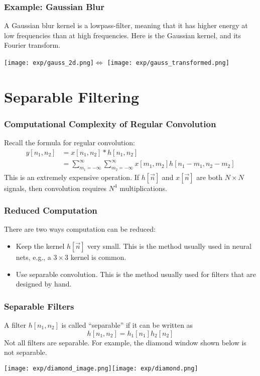 \documentclass{beamer}
\begin{document}
\begin{frame}
  \frametitle{Example: Gaussian Blur}

  A Gaussian blur kernel is a lowpass-filter, meaning that it has
  higher energy at low frequencies than at high frequencies.  Here is
  the Gaussian kernel, and its Fourier transform.

  \centerline{\texttt{[image: exp/gauss\_2d.png]}$\Leftrightarrow$
    \texttt{[image: exp/gauss\_transformed.png]}}
\end{frame}


\section{Separable Filtering}
\setcounter{subsection}{1}

\begin{frame}
  \frametitle{Computational Complexity of Regular Convolution}

  Recall the formula for regular convolution:
  \begin{align*}
    y[n_1,n_2] &= x[n_1,n_2]\ast h[n_1,n_2]\\
    &= \sum_{m_1=-\infty}^\infty\sum_{m_2=-\infty}^\infty x[m_1,m_2]h[n_1-m_1,n_2-m_2]
  \end{align*}
  This is an extremely expensive operation.  If $h[\vec{n}]$ and
  $x[\vec{n}]$ are both $N\times N$ signals, then convolution requires
  $N^4$ multiplications.
\end{frame}

\begin{frame}
  \frametitle{Reduced Computation}

  There are two ways computation can be reduced:
  \begin{itemize}
    \item Keep the kernel $h[\vec{n}]$ very small.  This is the method
      usually used in neural nets, e.g., a $3\times 3$ kernel is common.
    \item Use separable convolution.  This is the method usually used
      for filters that are designed by hand.
  \end{itemize}
\end{frame}

\begin{frame}
  \frametitle{Separable Filters}
  A filter $h[n_1,n_2]$ is called ``separable'' if it can be written as
  \[
  h[n_1,n_2] = h_1[n_1]h_2[n_2]
  \]
  Not all filters are separable.  For example, the diamond window
  shown below is not separable.
  \centerline{\texttt{[image: exp/diamond\_image.png]}\texttt{[image: exp/diamond.png]}}
\end{frame}
\end{document}

